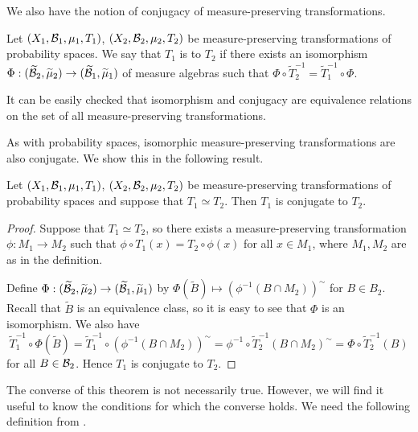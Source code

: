We also have the notion of conjugacy of measure-preserving transformations.

\begin{definition}
	Let $(X_1, \mathcal{B}_1, \mu_1, T_1)$, $(X_2, \mathcal{B}_2, \mu_2, T_2)$ be measure-preserving transformations of probability spaces. We say that $T_1$ is  to $T_2$ if there exists an isomorphism $\Phi : (\widetilde{\mathcal{B}}_2, \widetilde{\mu}_2) \to (\widetilde{\mathcal{B}}_1, \widetilde{\mu}_1)$ of measure algebras such that $\Phi \circ \tilde{T}_2^{-1} = \tilde{T}_1^{-1} \circ \Phi$.
\end{definition}

It can be easily checked that isomorphism and conjugacy are equivalence relations on the set of all measure-preserving transformations.

As with probability spaces, isomorphic measure-preserving transformations are also conjugate. We show this in the following result.

\begin{theorem}\label{thm:walters-2-5}
	Let $(X_1, \mathcal{B}_1, \mu_1, T_1)$, $(X_2, \mathcal{B}_2, \mu_2, T_2)$ be measure-preserving transformations of probability spaces and suppose that $T_1 \simeq T_2$. Then $T_1$ is conjugate to $T_2$.
	
	\begin{proof}
		Suppose that $T_1 \simeq T_2$, so there exists a measure-preserving transformation $\phi : M_1 \to M_2$ such that $\phi \circ T_1(x) = T_2 \circ \phi(x)$ for all $x \in M_1$, where $M_1, M_2$ are as in the definition.
		
		Define $\Phi : (\widetilde{\mathcal{B}}_2, \widetilde{\mu}_2) \to (\widetilde{\mathcal{B}}_1, \widetilde{\mu}_1)$ by $\Phi(\tilde{B}) \mapsto (\phi^{-1}(B \cap M_2))^\sim$ for $B \in B_2$. Recall that $\tilde{B}$ is an equivalence class, so it is easy to see that $\Phi$ is an isomorphism. We also have
		\[
			\tilde{T}_1^{-1} \circ \Phi(\tilde{B}) = \tilde{T}_1^{-1} \circ (\phi^{-1}(B \cap M_2))^\sim = \phi^{-1} \circ \tilde{T}_2^{-1} (B \cap M_2)^\sim = \Phi \circ \tilde{T}_2^{-1}(B)
		\]
		for all $B \in \mathcal{B}_2$. Hence $T_1$ is conjugate to $T_2$.
	\end{proof}
\end{theorem}

The converse of this theorem is not necessarily true. However, we will find it useful to know the conditions for which the converse holds. We need the following definition from \cite[Definition A.21]{einsiedler-ward:ergodic-nt}.

